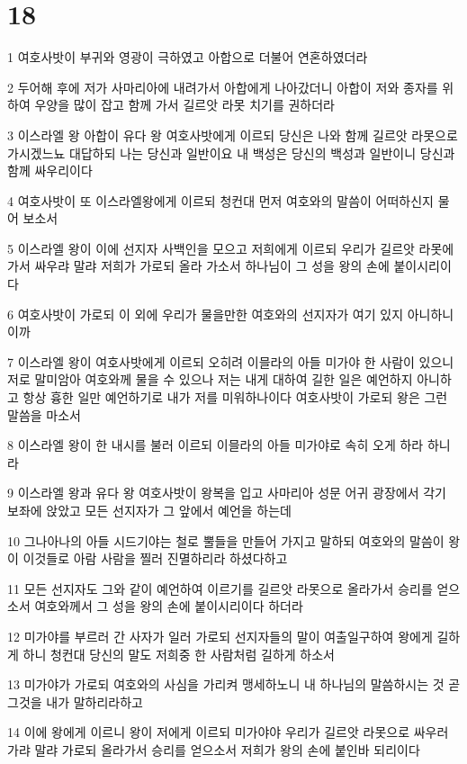 \chapter{18}

\par 1 여호사밧이 부귀와 영광이 극하였고 아합으로 더불어 연혼하였더라
\par 2 두어해 후에 저가 사마리아에 내려가서 아합에게 나아갔더니 아합이 저와 종자를 위하여 우양을 많이 잡고 함께 가서 길르앗 라못 치기를 권하더라
\par 3 이스라엘 왕 아합이 유다 왕 여호사밧에게 이르되 당신은 나와 함께 길르앗 라못으로 가시겠느뇨 대답하되 나는 당신과 일반이요 내 백성은 당신의 백성과 일반이니 당신과 함께 싸우리이다
\par 4 여호사밧이 또 이스라엘왕에게 이르되 청컨대 먼저 여호와의 말씀이 어떠하신지 물어 보소서
\par 5 이스라엘 왕이 이에 선지자 사백인을 모으고 저희에게 이르되 우리가 길르앗 라못에 가서 싸우랴 말랴 저희가 가로되 올라 가소서 하나님이 그 성을 왕의 손에 붙이시리이다
\par 6 여호사밧이 가로되 이 외에 우리가 물을만한 여호와의 선지자가 여기 있지 아니하니이까
\par 7 이스라엘 왕이 여호사밧에게 이르되 오히려 이믈라의 아들 미가야 한 사람이 있으니 저로 말미암아 여호와께 물을 수 있으나 저는 내게 대하여 길한 일은 예언하지 아니하고 항상 흉한 일만 예언하기로 내가 저를 미워하나이다 여호사밧이 가로되 왕은 그런 말씀을 마소서
\par 8 이스라엘 왕이 한 내시를 불러 이르되 이믈라의 아들 미가야로 속히 오게 하라 하니라
\par 9 이스라엘 왕과 유다 왕 여호사밧이 왕복을 입고 사마리아 성문 어귀 광장에서 각기 보좌에 앉았고 모든 선지자가 그 앞에서 예언을 하는데
\par 10 그나아나의 아들 시드기야는 철로 뿔들을 만들어 가지고 말하되 여호와의 말씀이 왕이 이것들로 아람 사람을 찔러 진멸하리라 하셨다하고
\par 11 모든 선지자도 그와 같이 예언하여 이르기를 길르앗 라못으로 올라가서 승리를 얻으소서 여호와께서 그 성을 왕의 손에 붙이시리이다 하더라
\par 12 미가야를 부르러 간 사자가 일러 가로되 선지자들의 말이 여출일구하여 왕에게 길하게 하니 청컨대 당신의 말도 저희중 한 사람처럼 길하게 하소서
\par 13 미가야가 가로되 여호와의 사심을 가리켜 맹세하노니 내 하나님의 말씀하시는 것 곧 그것을 내가 말하리라하고
\par 14 이에 왕에게 이르니 왕이 저에게 이르되 미가야야 우리가 길르앗 라못으로 싸우러 가랴 말랴 가로되 올라가서 승리를 얻으소서 저희가 왕의 손에 붙인바 되리이다

